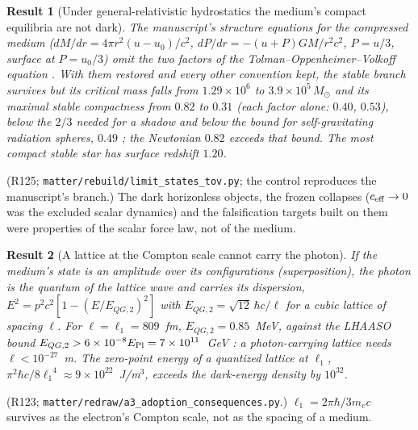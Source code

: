 \documentclass[11pt,a4paper]{article}
\newtheorem{prop}{Result}
\newcommand{\lone}{\ensuremath{\ell_1}}
\begin{document}
\begin{prop}[Under general-relativistic hydrostatics the medium's compact equilibria are not dark]
The manuscript's structure equations for the compressed medium ($dM/dr = 4\pi r^2(u-u_0)/c^2$, $dP/dr = -(u+P)GM/r^2c^2$, $P = u/3$, surface at $P = u_0/3$) omit the two factors of the Tolman--Oppenheimer--Volkoff equation \cite{tov1939}. With them restored and every other convention kept, the stable branch survives but its critical mass falls from $1.29\times10^{6}$ to $3.9\times10^{5}\,M_\odot$ and its maximal stable compactness from $0.82$ to $0.31$ (each factor alone: $0.40$, $0.53$), below the $2/3$ needed for a shadow and below the bound for self-gravitating radiation spheres, $0.49$ \cite{swz1981}; the Newtonian $0.82$ exceeds that bound. The most compact stable star has surface redshift $1.20$.
\end{prop}
\noindent(R125; \texttt{matter/rebuild/limit\_states\_tov.py}; the control reproduces the manuscript's branch.) The dark horizonless objects, the frozen collapses ($c_{\rm eff}\to0$ was the excluded scalar dynamics) and the falsification targets built on them were properties of the scalar force law, not of the medium.

\begin{prop}[A lattice at the Compton scale cannot carry the photon]
If the medium's state is an amplitude over its configurations (superposition), the photon is the quantum of the lattice wave and carries its dispersion, $E^2 = p^2c^2[1 - (E/E_{QG,2})^2]$ with $E_{QG,2} = \sqrt{12}\,\hbar c/\ell$ for a cubic lattice of spacing $\ell$. For $\ell = \lone = 809$~fm, $E_{QG,2} = 0.85$~MeV, against the LHAASO bound $E_{QG,2} > 6\times10^{-8}E_{\rm Pl} = 7\times10^{11}$~GeV \cite{lhaaso2026}: a photon-carrying lattice needs $\ell < 10^{-27}$~m. The zero-point energy of a quantized lattice at $\lone$, $\pi^2\hbar c/8\lone^4 \approx 9\times10^{22}$~J/m$^3$, exceeds the dark-energy density by $10^{32}$.
\end{prop}
\noindent(R123; \texttt{matter/redraw/a3\_adoption\_consequences.py}.) $\lone = 2\pi\hbar/3m_ec$ survives as the electron's Compton scale, not as the spacing of a medium.
\end{document}
